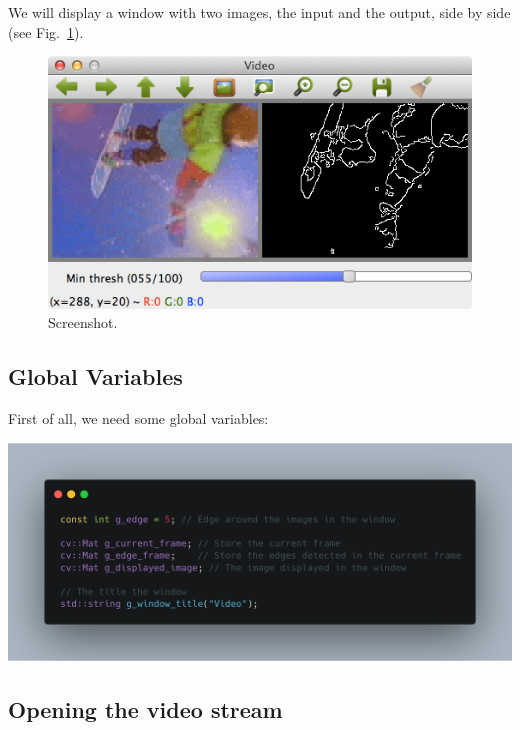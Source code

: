 \documentclass[english,a4paper,12pt,oneside]{article}
\begin{document}
We will display a window with two images, the input and the output, side by side (see Fig.~\ref{fig:screenshot}).
 \begin{figure}[htbp]
  \centering
  \includegraphics[width=0.7\linewidth]{screenshot1}
  \caption{\label{fig:screenshot}Screenshot.}
 \end{figure}

 \newpage
\subsection{Global Variables}

First of all, we need some global variables:

\includegraphics[width=\linewidth]{carbon}
% 
% 


 \newpage
\subsection{Opening the video stream}
\label{sec:param}
\end{document}
